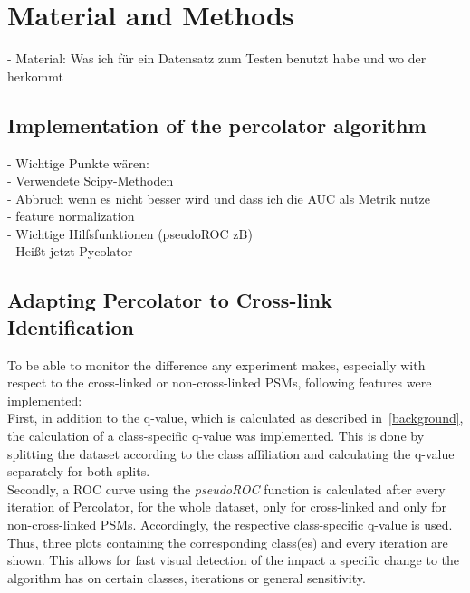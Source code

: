 
\chapter{Material and Methods}
\label{matmet}

- Material: Was ich für ein Datensatz zum Testen benutzt habe und wo der herkommt
\label{lab:matmet:dataset}

\section{Implementation of the percolator algorithm}
- Wichtige Punkte wären:\\
- Verwendete Scipy-Methoden\\
- Abbruch wenn es nicht besser wird und dass ich die AUC als Metrik nutze\\
- \label{lab:matmet:normalization} feature normalization\\
- Wichtige Hilfsfunktionen (pseudoROC zB)\\
- Heißt jetzt Pycolator

\section{Adapting Percolator to Cross-link Identification}
To be able to monitor the difference any experiment makes, especially with respect to the cross-linked or non-cross-linked PSMs, following features were implemented:\\
First, in addition to the q-value, which is calculated as described in~\ref{background}, the calculation of a class-specific q-value was implemented. This is done by splitting the dataset according to the class affiliation and calculating the q-value separately for both splits.\\
Secondly, a ROC curve using the \emph{pseudoROC} function is calculated after every iteration of Percolator, for the whole dataset, only for cross-linked and only for non-cross-linked PSMs. Accordingly, the respective class-specific q-value is used. Thus, three plots containing the corresponding class(es) and every iteration are shown. This allows for fast visual detection of the impact a specific change to the algorithm has on certain classes, iterations or general sensitivity.

